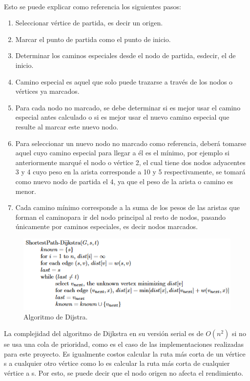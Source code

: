 \documentclass[11pt]{article}
\begin{document}
\paragraph{}
Esto se puede explicar como referencia los siguientes pasos:

\begin{enumerate}
\item Seleccionar vértice de partida, es decir un origen.
\item Marcar el punto de partida como el punto de inicio.
\item Determinar los caminos especiales desde el nodo de partida, esdecir, el de inicio.
\item Camino especial es aquel que solo puede trazarse a través de los nodos o vértices ya marcados.
\item Para  cada  nodo  no  marcado,  se  debe  determinar  si  es  mejor  usar  el  camino  especial antes calculado o si es mejor usar el nuevo camino especial que resulte al marcar este nuevo nodo.
\item Para  seleccionar  un  nuevo  nodo  no  marcado  como  referencia,  deberá  tomarse  aquel cuyo camino especial para llegar a él es el mínimo, por ejemplo si anteriormente marqué el  nodo  o  vértice  2,  el  cual  tiene  dos  nodos  adyacentes  3  y  4  cuyo  peso  en  la  arista corresponde a 10 y 5 respectivamente, se tomará como nuevo nodo de partida el 4, ya que el peso de la arista o camino es menor.
\item Cada camino mínimo corresponde a la suma de los pesos de las aristas que forman el caminopara  ir  del  nodo  principal  al  resto  de  nodos,  pasando  únicamente  por  caminos especiales, es decir nodos marcados.
\end{enumerate}

\begin{figure}
\includegraphics[width=0.9\linewidth]{algoritmo.png}
  \caption{Algoritmo de Dijstra.}
\end{figure}

\par
La complejidad del algoritmo de Dijkstra en su versión serial es de $O(n^2)$ si no se usa una cola de prioridad, como es el caso de las implementaciones realizadas para este proyecto. Es igualmente costos calcular la ruta más corta de un vértice s a cualquier otro vértice como lo es calcular la ruta más corta de cualquier vértice a s. Por esto, se puede decir que el nodo origen no afecta el rendimiento. 
\end{document}
